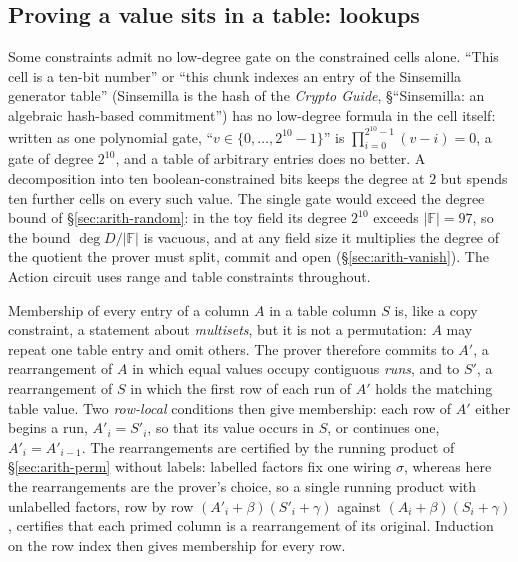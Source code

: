 \documentclass[11pt,a4paper]{article}
\theoremstyle{definition}
\newcommand{\F}{\mathbb{F}}
\begin{document}
\subsection{Proving a value sits in a table: lookups}
\label{sec:arith-lookups}

Some constraints admit no low-degree gate on the constrained cells alone.
``This cell is a ten-bit number'' or ``this chunk indexes an entry of the
Sinsemilla generator table'' (Sinsemilla is the hash of the \emph{Crypto
Guide}, \S``Sinsemilla: an algebraic hash-based commitment'') has no
low-degree formula in the cell itself: written as one polynomial gate,
``$v \in \{0, \dots, 2^{10}-1\}$'' is $\prod_{i=0}^{2^{10}-1} (v - i) = 0$,
a gate of degree $2^{10}$, and a table of arbitrary entries does no
better. A decomposition into ten boolean-constrained bits keeps the degree
at $2$ but spends ten further cells on every such value. The single gate
would exceed the degree bound of \S\ref{sec:arith-random}: in the toy
field its degree $2^{10}$ exceeds $|\F| = 97$, so the bound
$\deg D/|\F|$ is vacuous, and at any field size it multiplies the degree
of the quotient the prover must split, commit and open
(\S\ref{sec:arith-vanish}). The Action
circuit uses range and table constraints throughout.

Membership of every entry of a column $A$ in a table column $S$ is, like
a copy constraint, a statement about \emph{multisets}, but it is not a
permutation: $A$ may repeat one table entry and omit others. The prover
therefore commits to $A'$, a rearrangement of $A$ in which equal values
occupy contiguous \emph{runs}, and to $S'$, a rearrangement of $S$ in
which the first row of each run of $A'$ holds the matching table value.
Two \emph{row-local} conditions then give membership: each row of $A'$
either begins a run, $A'_i = S'_i$, so that its value occurs in $S$, or
continues one, $A'_i = A'_{i-1}$. The rearrangements are certified by the
running product of \S\ref{sec:arith-perm} without labels: labelled
factors fix one wiring $\sigma$, whereas here the rearrangements are the
prover's choice, so a single running product with unlabelled factors, row
by row $(A'_i + \beta)(S'_i + \gamma)$ against
$(A_i + \beta)(S_i + \gamma)$, certifies that each primed column is a
rearrangement of its original. Induction on the row index then gives
membership for every row.
\end{document}
